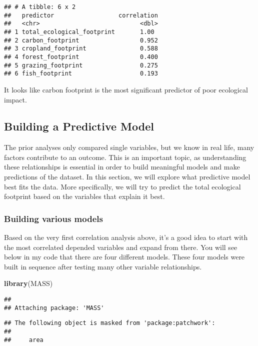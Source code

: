 \documentclass[
]{article}
\newenvironment{Shaded}{\begin{snugshade}}{\end{snugshade}}
\newcommand{\FunctionTok}[1]{\textcolor[rgb]{0.13,0.29,0.53}{\textbf{#1}}}
\newcommand{\NormalTok}[1]{#1}
\begin{document}
\begin{verbatim}
## # A tibble: 6 x 2
##   predictor                  correlation
##   <chr>                            <dbl>
## 1 total_ecological_footprint       1.00 
## 2 carbon_footprint                 0.952
## 3 cropland_footprint               0.588
## 4 forest_footprint                 0.400
## 5 grazing_footprint                0.275
## 6 fish_footprint                   0.193
\end{verbatim}

It looks like carbon footprint is the most significant predictor of poor
ecological impact.

\subsection{Building a Predictive
Model}\label{building-a-predictive-model}

The prior analyses only compared single variables, but we know in real
life, many factors contribute to an outcome. This is an important topic,
as understanding these relationships is essential in order to build
meaningful models and make predictions of the dataset. In this section,
we will explore what predictive model best fits the data. More
specifically, we will try to predict the total ecological footprint
based on the variables that explain it best.

\subsubsection{Building various models}\label{building-various-models}

Based on the very first correlation analysis above, it's a good idea to
start with the most correlated depended variables and expand from there.
You will see below in my code that there are four different models.
These four models were built in sequence after testing many other
variable relationships.

\begin{Shaded}
\begin{Highlighting}[]
\FunctionTok{library}\NormalTok{(MASS)}
\end{Highlighting}
\end{Shaded}

\begin{verbatim}
## 
## Attaching package: 'MASS'
\end{verbatim}

\begin{verbatim}
## The following object is masked from 'package:patchwork':
## 
##     area
\end{verbatim}
\end{document}
